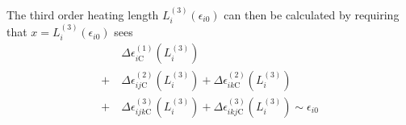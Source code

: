 \documentclass{article}
\begin{document}
The third order heating length $L_i^{(3)}(\epsilon_{i0})$ can then be calculated by requiring that $x = L_i^{(3)}(\epsilon_{i0})$ sees
\begin{align}
 & \Delta \epsilon_{i\text{C}}^{(1)}\left( L_i^{(3)} \right) \\
  +\  & \Delta \epsilon_{ij\text{C}}^{(2)}\left( L_i^{(3)} \right) + \Delta \epsilon_{ik\text{C}}^{(2)}\left( L_i^{(3)} \right) \\
  +\  & \Delta \epsilon_{ijk\text{C}}^{(3)}\left( L_i^{(3)} \right) + \Delta \epsilon_{ikj\text{C}}^{(3)}\left( L_i^{(3)} \right) \sim \epsilon_{i0}
\end{align}
\end{document}
